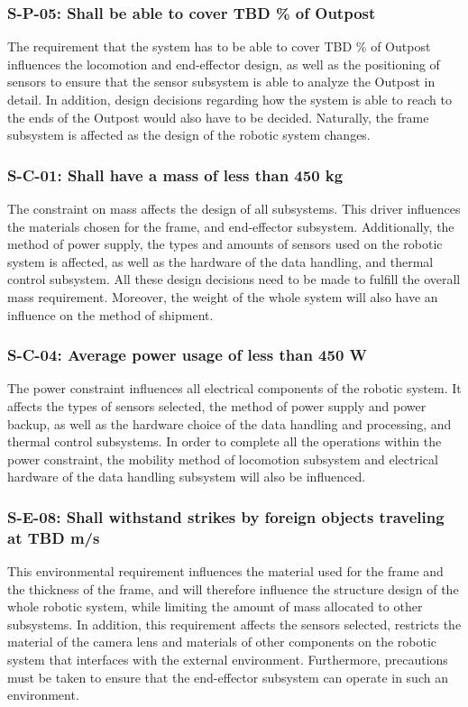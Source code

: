 \documentclass[12pt, letterpaper]{article}
\begin{document}
\subsubsection*{S-P-05: Shall be able to cover TBD \% of Outpost}
The requirement that the system has to be able to cover TBD \% of Outpost influences the locomotion and end-effector design, as well as the positioning of sensors to ensure that the sensor subsystem is able to analyze the Outpost in detail. In addition, design decisions regarding how the system is able to reach to the ends of the Outpost would also have to be decided. Naturally, the frame subsystem is affected as the design of the robotic system changes.
\subsubsection*{S-C-01: Shall have a mass of less than 450 kg}
The constraint on mass affects the design of all subsystems. This driver influences the materials chosen for the frame, and end-effector subsystem. Additionally, the method of power supply, the types and amounts of sensors used on the robotic system is affected, as well as the hardware of the data handling, and thermal control subsystem. All these design decisions need to be made to fulfill the overall mass requirement. Moreover, the weight of the whole system will also have an influence on the method of shipment.
\subsubsection*{S-C-04: Average power usage of less than 450 W}
The power constraint influences all electrical components of the robotic system. It affects the types of sensors selected, the method of power supply and power backup, as well as the hardware choice of the data handling and processing, and thermal control subsystems. In order to complete all the operations within the power constraint, the mobility method of locomotion subsystem and electrical hardware of the data handling subsystem will also be influenced.
\subsubsection*{S-E-08: Shall withstand strikes by foreign objects traveling at TBD m/s}
This environmental requirement influences the material used for the frame and the thickness of the frame, and will therefore influence the structure design of the whole robotic system, while limiting the amount of mass allocated to other subsystems. In addition, this requirement affects the sensors selected, restricts the material of the camera lens and materials of other components on the robotic system that interfaces with the external environment. Furthermore, precautions must be taken to ensure that the end-effector subsystem can operate in such an environment.
\end{document}
